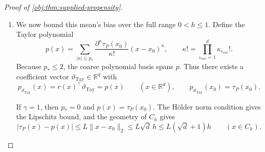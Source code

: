 \documentclass[11pt]{article}
\begin{document}
\begin{proof}[Proof of \cref{obj:thm:supplied-propensity}]
\begin{enumerate}
On the design cube, overlap and the binary record coordinates give
\[
|Z_P(x,a_{\mathrm{obs}},y_{\mathrm{obs}})|\le\varepsilon^{-1}.
\]
Outside the cube, the zero extension of the propensity gives
\[
Z_P(x,a_{\mathrm{obs}},y_{\mathrm{obs}})
=-(1-a_{\mathrm{obs}})y_{\mathrm{obs}},
\qquad
|Z_P(x,a_{\mathrm{obs}},y_{\mathrm{obs}})|\le1\le\varepsilon^{-1}.
\]
Hence the response bound is global, and
\[
|F_{P,h}(x,a_{\mathrm{obs}},y_{\mathrm{obs}})|
\le\varepsilon^{-1}h^{-d}K_{\mathrm{ev}}.
\]
Borel measurability and this bound supply all integrability and finite second moments used below.

For \(0<h\le1\), exchangeability and the conditional-margin identities in
\cref{obj:def:primitive-class}, followed by cancellation of the overlap denominators, give
\[
\mathbb E_P\left[
w_h(X)\mathcal K_h(X)\frac{AY}{e_P(X)}
\right]
=
\int_{[0,1]^d}w_h(x)\mathcal K_h(x)\mu_{1,P}(x)\,dx,
\]
\[
\mathbb E_P\left[
w_h(X)\mathcal K_h(X)\frac{(1-A)Y}{1-e_P(X)}
\right]
=
\int_{[0,1]^d}w_h(x)\mathcal K_h(x)\mu_{0,P}(x)\,dx.
\]
Subtracting and using the canonical contrast identity gives
\[
\mathbb E_P[F_{P,h}(X,A,Y)]
=
\int\mathcal K_h(x)\tau_P(x)\,d\nu_h(x).
\]
Every labeled coordinate has this expectation, while the auxiliary block and randomizer integrate out as probability factors. Since \(n>0\),
\[
\mu_{P,h}
=
\int\mathcal K_h(x)\tau_P(x)\,d\nu_h(x).
\]

\item We now bound this mean's bias over the full range \(0<h\le1\). Define the Taylor polynomial
\[
p(x)=
\sum_{|\kappa|\le p_*}
\frac{\partial^\kappa\tau_P(x_0)}{\kappa!}
(x-x_0)^\kappa,
\qquad
\kappa!=\prod_{\iota_{\mathrm{cov}}=1}^d\kappa_{\iota_{\mathrm{cov}}}!.
\]
Because \(p_*\le2\), the coarse polynomial basis spans \(p\). Thus there exists a coefficient vector \(\vartheta_{\mathrm{Tay}}\in\mathbb R^q\) with
\[
p_{\vartheta_{\mathrm{Tay}}}(x)
=
r(x)^\top\vartheta_{\mathrm{Tay}}
=
p(x)
\qquad(x\in\mathbb R^d),
\qquad
p_{\vartheta_{\mathrm{Tay}}}(x_0)=\tau_P(x_0).
\]

If \(\gamma=1\), then \(p_*=0\) and \(p(x)=\tau_P(x_0)\). The Hölder norm condition gives the Lipschitz bound, and the geometry of \(C_h\) gives
\[
|\tau_P(x)-p(x)|
\le L\|x-x_0\|_2
\le L\sqrt d\,h
\le L(\sqrt d+1)h
\qquad(x\in C_h).
\]


\end{enumerate}
\end{proof}
\end{document}
